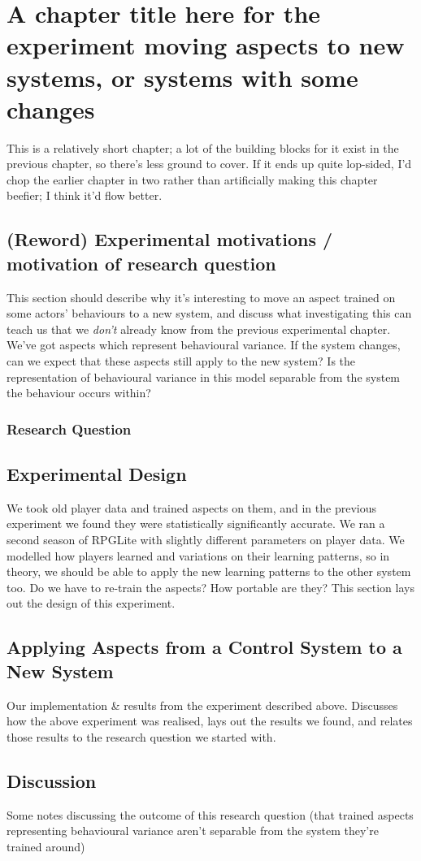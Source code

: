\chapter{A chapter title here for the experiment moving aspects to new systems, or systems with some changes}

This is a relatively short chapter; a lot of the building blocks for it exist in
the previous chapter, so there's less ground to cover. If it ends up quite
lop-sided, I'd chop the earlier chapter in two rather than artificially making
this chapter beefier; I think it'd flow better.

\section{(Reword) Experimental motivations / motivation of research question}
This section should describe why it's interesting to move an aspect trained on
some actors' behaviours to a new system, and discuss what investigating this can
teach us that we \emph{don't} already know from the previous experimental
chapter. We've got aspects which represent behavioural variance. If the system
changes, can we expect that these aspects still apply to the new system? Is the
representation of behavioural variance in this model separable from the system
the behaviour occurs within?

\subsection{Research Question}

\section{Experimental Design}
We took old player data and trained aspects on them, and in the previous
experiment we found they were statistically significantly accurate. We ran a
second season of RPGLite with slightly different parameters on player data. We
modelled how players learned and variations on their learning patterns, so in
theory, we should be able to apply the new learning patterns to the other system
too. Do we have to re-train the aspects? How portable are they? This section
lays out the design of this experiment.



\section{Applying Aspects from a Control System to a New System}
Our implementation & results from the experiment described above. Discusses how
the above experiment was realised, lays out the results we found, and relates
those results to the research question we started with.


\section{Discussion}
Some notes discussing the outcome of this research question (that trained
aspects representing behavioural variance aren't separable from the system
they're trained around)

